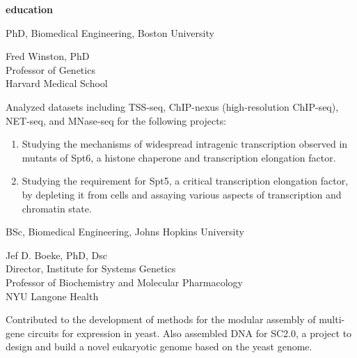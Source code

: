 \documentclass[11pt, a4paper]{article}
\begin{document}
\vspace{1em}
\textbf{\Large education}
\begin{description}[topsep=2pt, align=right, leftmargin=!, labelwidth=\widthof{\textbf{2019}}]
    \item [2019] PhD, Biomedical Engineering, Boston University
        \begin{description}[topsep=0pt, align=right, leftmargin=!, labelwidth=\widthof{summary:}, font=\normalfont]
            \item [advisor:] Fred Winston, PhD \\ Professor of Genetics \\ Harvard Medical School
            \item [summary:] Analyzed datasets including TSS-seq, ChIP-nexus (high-resolution ChIP-seq), NET-seq, and MNase-seq for the following projects:
                \begin{enumerate}
                    \item Studying the mechanisms of widespread intragenic transcription observed in mutants of Spt6, a histone chaperone and transcription elongation factor.
                    \item Studying the requirement for Spt5, a critical transcription elongation factor, by depleting it from cells and assaying various aspects of transcription and chromatin state.
                \end{enumerate}
        \end{description}
    \item [2013] BSc, Biomedical Engineering, Johns Hopkins University
        \begin{description}[topsep=0pt, align=right, leftmargin=!, labelwidth=\widthof{summary:}, font=\normalfont]
            \item [advisor:] Jef D. Boeke, PhD, Dsc \\ Director, Institute for Systems Genetics \\ Professor of Biochemistry and Molecular Pharmacology \\ NYU Langone Health
            \item [summary:] Contributed to the development of methods for the modular assembly of multi-gene circuits for expression in yeast. Also assembled DNA for SC2.0, a project to design and build a novel eukaryotic genome based on the yeast genome.
        \end{description}
\end{description}
\end{document}
